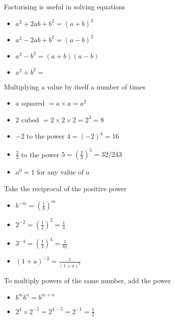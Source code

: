 \begin{frame}
Factorising is useful in solving equations
\begin{itemize}
	\item $ a^2 + 2ab +b^2  = (a + b)^2$
	\item $a^2 -2ab +b^2  =  (a - b)^2$
	\item $ a^2 - b^2  =  (a + b)(a - b)$
	\item $ a^2 + b^2  =  $
\end{itemize}
\end{frame}
\begin{frame}
Multiplying a value by itself a number of times
\begin{itemize}
	\item $a$ squared $= a \times a  =  a^2$
	\item $2$ cubed  $=  2 \times 2 \times 2  =  2^3  =  8$
	\item $-2$ to the power $4  =  (-2)^4  =  16$
	\item $ \frac{2}{3}$ to the power $5  =  (\frac{2}{3})^5  =  32/243$
	\item $a^0 = 1$ for any value of $a$

\end{itemize}
\end{frame}
\begin{frame}
Take the reciprocal of the positive power
\begin{itemize}
	\item $	b^{-m}  =  (\frac{1}{b})^m $
	\item $2^{-2}=  (\frac{1}{2})^2  =  \frac{1}{4}$
	\item $3^{-4}  =  (\frac{1}{3})^4  =  \frac{1}{81}$
	\item $ (1 + a)^{-2}  =  \frac{1}{(1 + a)^2}$
\end{itemize}
\end{frame}
\begin{frame}
To multiply powers of the same number, add the power
\begin{itemize}
	\item $	b^m b^n  =  b^{m+n} $
	\item $2^4 \times 2^{-5}  =  2^{4-5}  =  2^{-1}  =  \frac{1}{2}$
\end{itemize}
\end{frame}
